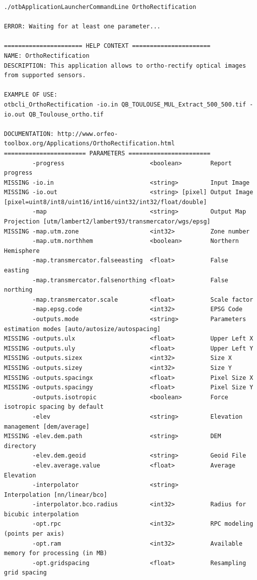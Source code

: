 \begin{scriptsize}
\begin{verbatim}
./otbApplicationLauncherCommandLine OrthoRectification

ERROR: Waiting for at least one parameter...

====================== HELP CONTEXT ======================
NAME: OrthoRectification
DESCRIPTION: This application allows to ortho-rectify optical images from supported sensors.

EXAMPLE OF USE: 
otbcli_OrthoRectification -io.in QB_TOULOUSE_MUL_Extract_500_500.tif -io.out QB_Toulouse_ortho.tif

DOCUMENTATION: http://www.orfeo-toolbox.org/Applications/OrthoRectification.html
======================= PARAMETERS =======================
        -progress                        <boolean>        Report progress 
MISSING -io.in                           <string>         Input Image 
MISSING -io.out                          <string> [pixel] Output Image  [pixel=uint8/int8/uint16/int16/uint32/int32/float/double]
        -map                             <string>         Output Map Projection [utm/lambert2/lambert93/transmercator/wgs/epsg]
MISSING -map.utm.zone                    <int32>          Zone number 
        -map.utm.northhem                <boolean>        Northern Hemisphere 
        -map.transmercator.falseeasting  <float>          False easting 
        -map.transmercator.falsenorthing <float>          False northing 
        -map.transmercator.scale         <float>          Scale factor 
        -map.epsg.code                   <int32>          EPSG Code 
        -outputs.mode                    <string>         Parameters estimation modes [auto/autosize/autospacing]
MISSING -outputs.ulx                     <float>          Upper Left X 
MISSING -outputs.uly                     <float>          Upper Left Y 
MISSING -outputs.sizex                   <int32>          Size X 
MISSING -outputs.sizey                   <int32>          Size Y 
MISSING -outputs.spacingx                <float>          Pixel Size X 
MISSING -outputs.spacingy                <float>          Pixel Size Y 
        -outputs.isotropic               <boolean>        Force isotropic spacing by default 
        -elev                            <string>         Elevation management [dem/average]
MISSING -elev.dem.path                   <string>         DEM directory 
        -elev.dem.geoid                  <string>         Geoid File 
        -elev.average.value              <float>          Average Elevation 
        -interpolator                    <string>         Interpolation [nn/linear/bco]
        -interpolator.bco.radius         <int32>          Radius for bicubic interpolation 
        -opt.rpc                         <int32>          RPC modeling (points per axis) 
        -opt.ram                         <int32>          Available memory for processing (in MB) 
        -opt.gridspacing                 <float>          Resampling grid spacing 
\end{verbatim}
\end{scriptsize}

